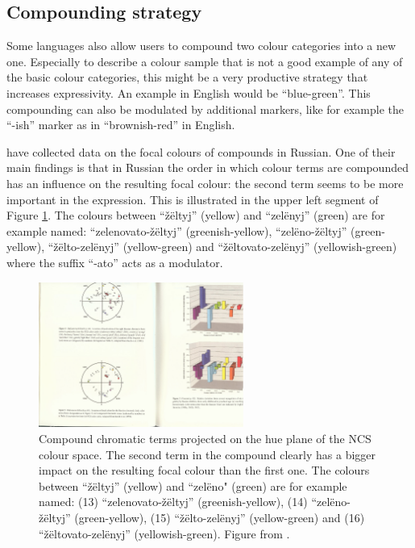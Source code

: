 \subsection{Compounding strategy}

Some languages also allow users to compound two colour categories into
a new one. Especially to describe a colour sample that is not a good
example of any of the basic colour categories, this might be a very
productive strategy that increases expressivity. An example in English
would be ``blue-green''. This compounding can also be modulated by
additional markers, like for example the ``-ish'' marker as in
``brownish-red'' in English.

\cite{safuanova07russian} have collected data on the focal colours of
compounds in Russian. One of their main findings is that in Russian
the order in which colour terms are compounded has an influence on
the resulting focal colour: the second term seems to be more important
in the expression. This is illustrated in the upper left segment of
Figure \ref{f:category-combination}. The colours between ``\v
z\"eltyj'' (yellow) and ``zel\"enyj'' (green) are for example named:
``zelenovato-\v z\"eltyj'' (greenish-yellow), ``zel\"eno-\v z\"eltyj''
(green-yellow), ``\v z\"elto-zel\"enyj'' (yellow-green) and ``\v
z\"eltovato-zel\"enyj'' (yellowish-green) where the suffix ``-ato''
acts as a modulator.

\begin{figure}[htbp]
  \begin{center}
   \includegraphics[width=0.6\textwidth]{./intro/figures/category-combination.pdf}
   \caption[Compound chromatic terms in Russian]{Compound chromatic
     terms projected on the hue plane of the NCS colour space. The
     second term in the compound clearly has a bigger impact on the
     resulting focal colour than the first one. The colours between
     ``\v z\"eltyj'' (yellow) and ``zel\"eno" (green) are for example
     named: (13) ``zelenovato-\v z\"eltyj'' (greenish-yellow), (14)
     ``zel\"eno-\v z\"eltyj'' (green-yellow), (15) ``\v
     z\"elto-zel\"enyj'' (yellow-green) and (16) ``\v
     z\"eltovato-zel\"enyj'' (yellowish-green). Figure from
     \cite{safuanova07russian}.}
    \label{f:category-combination}
  \end{center}
\end{figure}

